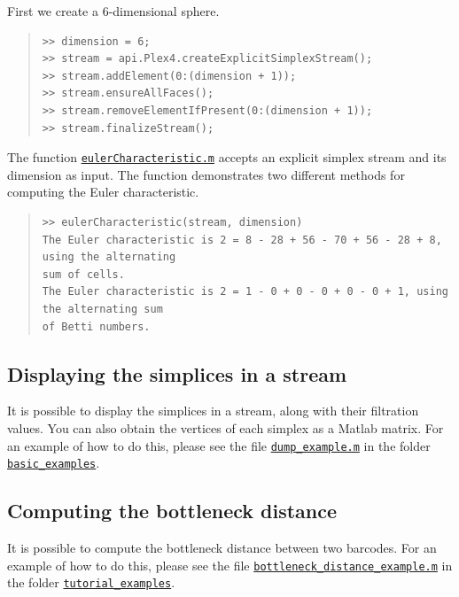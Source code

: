 \documentclass[amscd, amssymb, verbatim]{amsart}[12pt]
\theoremstyle{remark}
\theoremstyle{remark}
\theoremstyle{remark}
\begin{document}
First we create a 6-dimensional sphere. 

\begin{quote} \begin{verbatim}
>> dimension = 6;
>> stream = api.Plex4.createExplicitSimplexStream();
>> stream.addElement(0:(dimension + 1));
>> stream.ensureAllFaces();
>> stream.removeElementIfPresent(0:(dimension + 1));
>> stream.finalizeStream();
\end{verbatim} \end{quote}

The function \href{https://github.com/appliedtopology/javaplex/tree/master/src/matlab/for_distribution/tutorial_examples/eulerCharacteristic.m}{\texttt{eulerCharacteristic.m}} accepts an explicit simplex stream and its dimension as input. The function demonstrates two different methods for computing the Euler characteristic.

\begin{quote} \begin{verbatim}
>> eulerCharacteristic(stream, dimension)
The Euler characteristic is 2 = 8 - 28 + 56 - 70 + 56 - 28 + 8, using the alternating 
sum of cells.
The Euler characteristic is 2 = 1 - 0 + 0 - 0 + 0 - 0 + 1, using the alternating sum 
of Betti numbers.
\end{verbatim} \end{quote}


\subsection{Displaying the simplices in a stream}

It is possible to display the simplices in a stream, along with their filtration values. You can also obtain the vertices of each simplex as a Matlab matrix. For an example of how to do this, please see the file \href{https://github.com/appliedtopology/javaplex/blob/master/src/matlab/for_distribution/basic_examples/dump_example.m}{\texttt{dump\_example.m}} in the folder \href{https://github.com/appliedtopology/javaplex/tree/master/src/matlab/for_distribution/basic_examples}{\texttt{basic\_examples}}.


\subsection{Computing the bottleneck distance}

It is possible to compute the bottleneck distance between two barcodes. For an example of how to do this, please see the file \href{https://github.com/appliedtopology/javaplex/tree/master/src/matlab/for_distribution/tutorial_examples/bottleneck_distance_example.m}{\texttt{bottleneck\_distance\_example.m}} in the folder \href{https://github.com/appliedtopology/javaplex/tree/master/src/matlab/for_distribution/tutorial_examples}{\texttt{tutorial\_examples}}.
\end{document}
